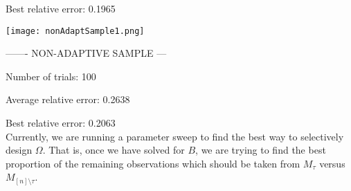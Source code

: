 \documentclass[12pt]{article}
\begin{document}
Best relative error: 0.1965

  \begin{center}
\texttt{[image: nonAdaptSample1.png]}\\
\end{center}  

------- NON-ADAPTIVE SAMPLE ---

Number of trials: 100

Average relative error: 0.2638

Best relative error: 0.2063\\

Currently, we are running a parameter sweep to find the best way to selectively design $\Omega$. That is, once we have solved for $B$, we are trying to find the best proportion of the remaining observations which should be taken from $M_\tau$ versus $M_{[n]\setminus \tau}$. 































 
 
\end{document}

